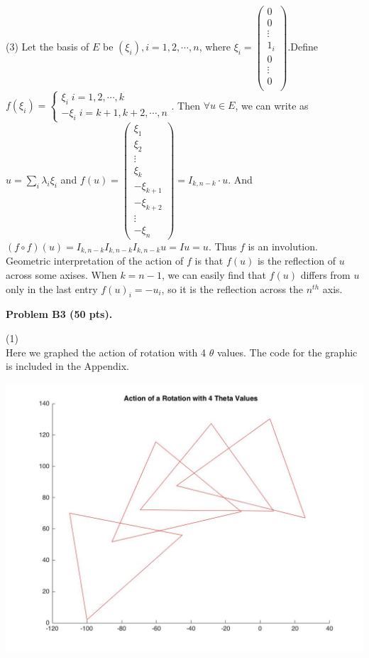\documentclass[12pt]{article}
\begin{document}
\medskip
(3)
Let the basis of $E$ be $(\xi_i), i = 1, 2, \cdots, n$, where $\xi_i = 
\begin{pmatrix}
0 \\
0 \\
\vdots \\
1_i \\
0 \\
\vdots \\
0 \\
\end{pmatrix}
$.Define \\
$
f(\xi_i) = \left \{
				\begin{array}{ll}
				\xi_i \; i = 1,2,\cdots,k \\
				-\xi_i \; i = k+1, k+2, \cdots, n				
				\end{array}
			\right.
$. Then $\forall u \in E$, we can write as $u = \sum_i \lambda_i \xi_i$ and $f(u) = 
\begin{pmatrix}
\xi_1 \\
\xi_2 \\
\vdots \\
\xi_k \\
-\xi_{k+1} \\
-\xi_{k+2} \\
\vdots \\
-\xi_n
\end{pmatrix} 
= I_{k , n - k} \cdot u
$. 
And $
(f \circ f)(u) = I_{k , n - k}I_{k , n - k}  I_{k , n - k}  u = I u = u
$. Thus $f$ is an involution.\\
Geometric interpretation of the action of $f$ is that $f(u)$ is the reflection of $u$ across some axises. When $k = n - 1$, we can easily find that $f(u)$ differs from $u$ only in the last entry $f(u)_i = -u_i$, so it is the reflection across the $n^{th}$ axis.

\vspace {0.5cm}\noindent
{\bf Problem B3 (50 pts).}


\medskip
(1)\\
Here we graphed the action of rotation with 4 $\theta$ values. The code for the graphic is included in the Appendix.

\includegraphics[scale=.25]{RotationPlot}
\end{document}
